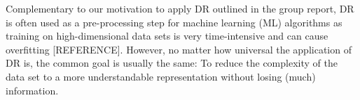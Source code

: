 \documentclass[journal, a4paper]{IEEEtran}
\begin{document}



Complementary to our motivation to apply DR outlined in the group report, DR is often used as a pre-processing step for machine learning (ML) algorithms as training on high-dimensional data sets is very time-intensive and can cause overfitting [REFERENCE]. However, no matter how universal the application of DR is, the common goal is usually the same: To reduce the complexity of the data set to a more understandable representation without losing (much) information. \\



%


\end{document}
